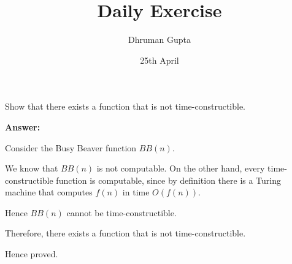 \documentclass[11pt]{article}
\title{Daily Exercise}
\author{Dhruman Gupta}
\date{25th April}
\begin{document}

Show that there exists a function that is not time-constructible.

\textbf{Answer:}

Consider the Busy Beaver function $BB(n)$.

We know that $BB(n)$ is not computable. On the other hand, every time-constructible function is computable, since by definition there is a Turing machine that computes $f(n)$ in time $O(f(n))$.

Hence $BB(n)$ cannot be time-constructible.

Therefore, there exists a function that is not time-constructible.

Hence proved.
\end{document}
